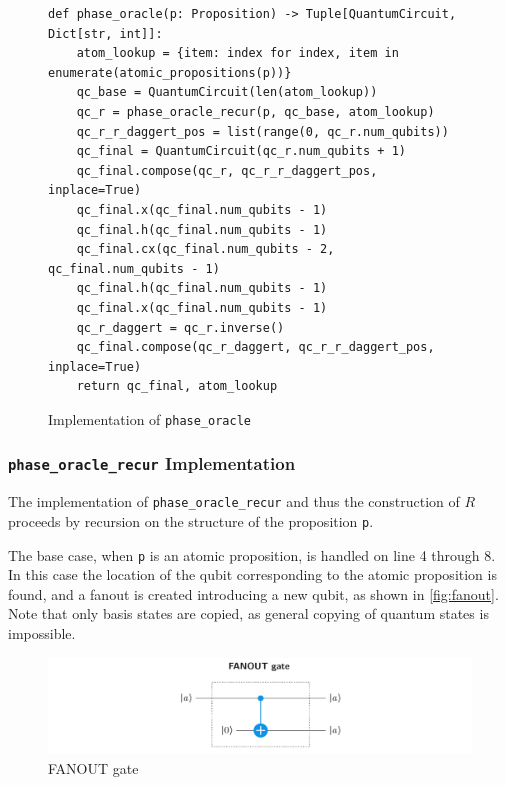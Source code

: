\begin{figure}[H]
\centering
\begin{verbatim}
def phase_oracle(p: Proposition) -> Tuple[QuantumCircuit, Dict[str, int]]:
    atom_lookup = {item: index for index, item in enumerate(atomic_propositions(p))}
    qc_base = QuantumCircuit(len(atom_lookup))
    qc_r = phase_oracle_recur(p, qc_base, atom_lookup)
    qc_r_r_daggert_pos = list(range(0, qc_r.num_qubits))
    qc_final = QuantumCircuit(qc_r.num_qubits + 1)
    qc_final.compose(qc_r, qc_r_r_daggert_pos, inplace=True)
    qc_final.x(qc_final.num_qubits - 1)
    qc_final.h(qc_final.num_qubits - 1)
    qc_final.cx(qc_final.num_qubits - 2, qc_final.num_qubits - 1)
    qc_final.h(qc_final.num_qubits - 1)
    qc_final.x(qc_final.num_qubits - 1)
    qc_r_daggert = qc_r.inverse()
    qc_final.compose(qc_r_daggert, qc_r_r_daggert_pos, inplace=True)
    return qc_final, atom_lookup
\end{verbatim}
\caption{Implementation of \texttt{phase_oracle} }
\label{fig:phase_oracle}
\end{figure}

\subsubsection{\texttt{phase\_oracle\_recur} Implementation}\label{subsubsec:phase-oracle-recur-implementation}

The implementation of \texttt{phase\_oracle\_recur} and thus the construction of $R$ proceeds by recursion on the structure of the proposition \texttt{p}.

The base case, when \texttt{p} is an atomic proposition, is handled on line 4 through 8.
In this case the location of the qubit corresponding to the atomic proposition is found, and a fanout is created introducing a new qubit, as shown in \autoref{fig:fanout}.
Note that only basis states are copied, as general copying of quantum states is impossible.

\begin{figure}[H]
    \centering
    \includegraphics[width=\textwidth]{figures/FANOUT-with-CNOT.jpg}
    \caption{FANOUT gate}
    \label{fig:fanout}
\end{figure}

